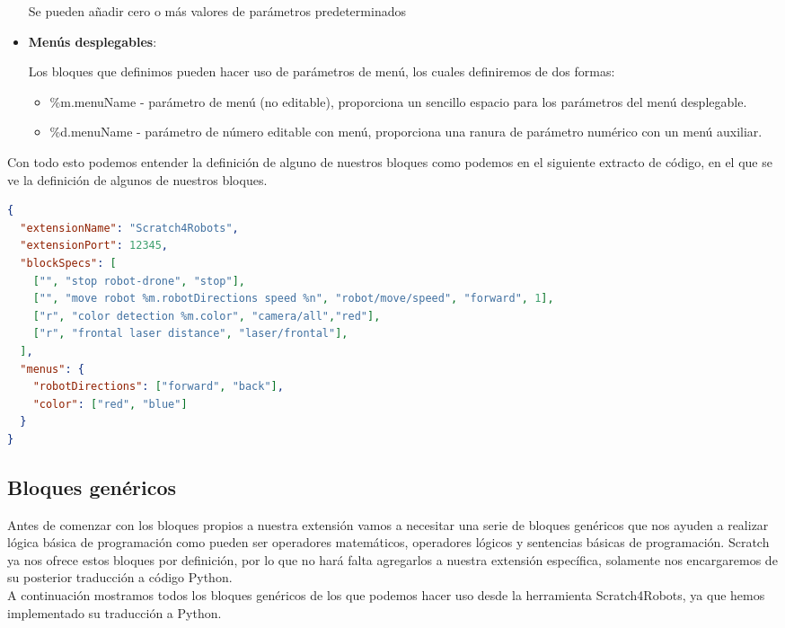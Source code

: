 \begin{itemize}
Se pueden añadir cero o más valores de parámetros predeterminados

\item \textbf{Menús desplegables}:

Los bloques que definimos pueden hacer uso de parámetros de menú, los cuales definiremos de dos formas:
\begin{itemize}
\item \%m.menuName - parámetro de menú (no editable), proporciona un sencillo espacio para los parámetros del menú desplegable.
\item \%d.menuName - parámetro de número editable con menú, proporciona una ranura de parámetro numérico con un menú auxiliar.
\end{itemize}
\end{itemize}

Con todo esto podemos entender la definición de alguno de nuestros bloques como podemos en el siguiente extracto de código, en el que se ve la definición de algunos de nuestros bloques.
\begin{nobreak} 
\begin{lstlisting}[language=json,firstnumber=1]
{
  "extensionName": "Scratch4Robots",
  "extensionPort": 12345, 
  "blockSpecs": [
    ["", "stop robot-drone", "stop"],         
    ["", "move robot %m.robotDirections speed %n", "robot/move/speed", "forward", 1],
    ["r", "color detection %m.color", "camera/all","red"],
    ["r", "frontal laser distance", "laser/frontal"],
  ],
  "menus": {
    "robotDirections": ["forward", "back"],         
    "color": ["red", "blue"]
  }
}

\end{lstlisting}
\end{nobreak} 

\subsection{Bloques genéricos}
Antes de comenzar con los bloques propios a nuestra extensión vamos a necesitar una serie de bloques genéricos que nos ayuden a realizar lógica básica de programación como pueden ser operadores matemáticos, operadores lógicos y sentencias básicas de programación. Scratch ya nos ofrece estos bloques por definición, por lo que no hará falta agregarlos a nuestra extensión específica, solamente nos encargaremos de su posterior traducción a código Python.\\

A continuación mostramos todos los bloques genéricos de los que podemos hacer uso desde la herramienta Scratch4Robots, ya que hemos implementado su traducción a Python.

